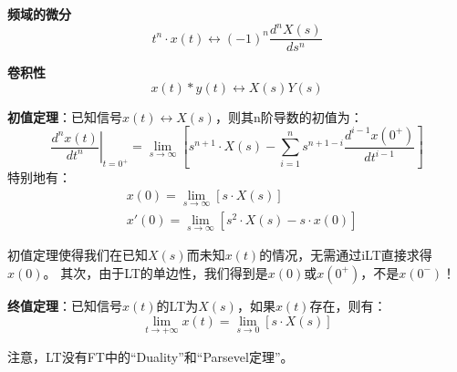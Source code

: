 {\bf 频域的微分}
\[
t^n\cdot x\left( t \right) \leftrightarrow \left( -1 \right) ^n\frac{d^nX\left( s \right)}{ds^n}
\]

{\bf 卷积性}
\[
x\left( t \right) \ast y\left( t \right) \leftrightarrow X\left( s \right) Y\left( s \right)
\]

{\bf 初值定理}：已知信号$x\left( t \right) \leftrightarrow X\left( s \right) $，则其n阶导数的初值为：
\[
\left. \frac{d^nx\left( t \right)}{dt^n} \right|_{t=0^+}=\underset{s\rightarrow \infty}\lim \left[ s^{n+1}\cdot X\left( s \right) -\sum_{i=1}^n{s^{n+1-i}\frac{d^{i-1}x\left( 0^+ \right)}{dt^{i-1}}} \right]
\]
特别地有：
\begin{align*}
&x\left( 0 \right) =\underset{s\rightarrow \infty}\lim \left[ s\cdot X\left( s \right) \right] \\
&x'\left( 0 \right) =\underset{s\rightarrow \infty}\lim \left[ s^2\cdot X\left( s \right) -s\cdot x\left( 0 \right) \right]
\end{align*}

初值定理使得我们在已知$X\left( s \right) $而未知$x\left( t \right) $的情况，无需通过iLT直接求得$x\left( 0 \right) $。
其次，由于LT的单边性，我们得到是$x\left( 0 \right) $或$x\left( 0^+ \right) $，不是$x\left( 0^- \right) $！

{\bf 终值定理}：已知信号$x\left( t \right) $的LT为$X\left( s \right) $，如果$x\left( t \right) $存在，则有：
\[
\underset{t\rightarrow +\infty}\lim x\left( t \right) =\underset{s\rightarrow 0}\lim \left[ s\cdot X\left( s \right) \right]
\]

\begin{tcolorbox}
注意，LT没有FT中的“Duality”和“Parsevel定理”。
\end{tcolorbox}




